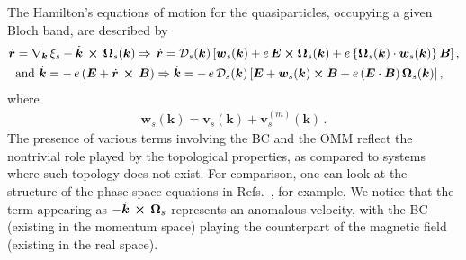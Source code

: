 \documentclass[aps,prb,onecolumn,nofootinbib,citeautoscript,10pt, showkeys]{revtex4-2}
\def \nn{\nonumber \\}
\begin{document}
The Hamilton's equations of motion for the quasiparticles, occupying a given Bloch band, are described by \cite{mermin, sundaram99_wavepacket, li2023_planar, ips-kush-review, ips-rsw-ph, ips-shreya}
\begin{align}
\label{eqrkdot}
\dot {\boldsymbol r} & = \nabla_{\boldsymbol k} \, \xi_s  
- \dot{\boldsymbol k} \, \cross \, \boldsymbol \Omega_s  (\boldsymbol k)
\Rightarrow  \, \dot{\boldsymbol r}  = \mathcal{D}_s ({\boldsymbol k})
	\left[   \boldsymbol{w}_s ({\boldsymbol k}) +
	 e \, {\boldsymbol E}  \cross  
\boldsymbol \Omega_s ({\boldsymbol k})   + 
	 e   \left \lbrace \boldsymbol \Omega_s (\boldsymbol k ) \cdot \boldsymbol{w}_s ({\boldsymbol k}) 
 \right \rbrace  \boldsymbol B  \right], \nn & 
\text{and } 
\dot{\boldsymbol k} = -\, e  \left( {\boldsymbol E}  
+ \dot{\boldsymbol r} \, \cross\, {\boldsymbol B} 
	\right ) \Rightarrow
\dot{\boldsymbol k}  = -\, e \,\mathcal{D}_s ({\boldsymbol k})
  \left[   {\boldsymbol E} 
+   \boldsymbol{w}_s ({\boldsymbol k}) \cross  {\boldsymbol B} 
+  e  \left (  {\boldsymbol E}\cdot  {\boldsymbol B} \right )  
\boldsymbol \Omega_s  ({\boldsymbol k})\right],
\end{align}
where
\begin{align}
\boldsymbol{w}_s ({\boldsymbol k}) = {\boldsymbol  v}_s(\boldsymbol k )
+  {\boldsymbol   v}_s^{(m)} ({\boldsymbol k} ) \,.
\end{align}
The presence of various terms involving the BC and the OMM reflect the nontrivial role played by the topological properties, as compared to systems where such topology does not exist. For comparison, one can look at the structure of the phase-space equations in Refs.~\cite{ips-kush, ips_tilted_dirac}, for example. We notice that the term appearing as $- \dot{\boldsymbol k} \, \cross \, \boldsymbol \Omega_s $ represents an anomalous velocity, with the BC (existing in the momentum space) playing the counterpart of the magnetic field (existing in the real space). 
\end{document}
